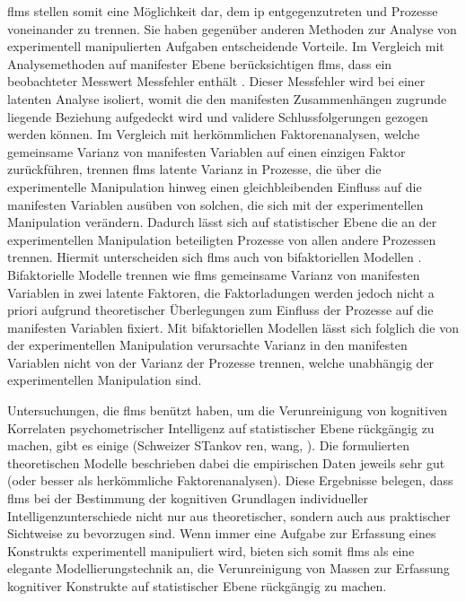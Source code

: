 \documentclass[11pt, twoside, a4paper]{book}		%
\begin{document}
\glspl{flm} stellen somit eine Möglichkeit dar, dem \gls{ip} entgegenzutreten und Prozesse voneinander zu trennen. Sie haben gegenüber anderen Methoden zur Analyse von experimentell manipulierten Aufgaben entscheidende Vorteile.
Im Vergleich mit Analysemethoden auf manifester Ebene berücksichtigen \glspl{flm}, dass ein beobachteter Messwert Messfehler enthält \citep{Moosbrugger2007}. Dieser Messfehler wird bei einer latenten Analyse isoliert, womit die den manifesten Zusammenhängen zugrunde liegende Beziehung aufgedeckt wird und validere Schlussfolgerungen gezogen werden können.
Im Vergleich mit herkömmlichen Faktorenanalysen, welche gemeinsame Varianz von manifesten Variablen auf einen einzigen Faktor zurückführen, trennen \glspl{flm} latente Varianz in Prozesse, die über die experimentelle Manipulation hinweg einen gleichbleibenden Einfluss auf die manifesten Variablen ausüben von solchen, die sich mit der experimentellen Manipulation verändern. Dadurch lässt sich auf statistischer Ebene die an der experimentellen Manipulation beteiligten Prozesse von allen andere Prozessen trennen.
Hiermit unterscheiden sich \glspl{flm} auch von bifaktoriellen Modellen \citep{Moosbrugger2006, Schweizer2010}. Bifaktorielle Modelle trennen wie \glspl{flm} gemeinsame Varianz von manifesten Variablen in zwei latente Faktoren, die Faktorladungen werden jedoch nicht a priori aufgrund theoretischer Überlegungen zum Einfluss der Prozesse auf die manifesten Variablen fixiert. Mit bifaktoriellen Modellen lässt sich folglich die von der experimentellen Manipulation verursachte Varianz in den manifesten Variablen nicht von der Varianz der Prozesse trennen, welche unabhängig der experimentellen Manipulation sind.

Untersuchungen, die \glspl{flm} benützt haben, um die Verunreinigung von kognitiven Korrelaten psychometrischer Intelligenz auf statistischer Ebene rückgängig zu machen, gibt es einige \citep[z. B.][]{} (Schweizer STankov ren, wang, ). Die formulierten theoretischen Modelle beschrieben dabei die empirischen Daten jeweils sehr gut (oder besser als herkömmliche Faktorenanalysen). Diese Ergebnisse belegen, dass \glspl{flm} bei der Bestimmung der kognitiven Grundlagen individueller Intelligenzunterschiede nicht nur aus theoretischer, sondern auch aus praktischer Sichtweise zu bevorzugen sind. Wenn immer eine Aufgabe zur Erfassung eines Konstrukts experimentell manipuliert wird, bieten sich somit \glspl{flm} als eine elegante Modellierungstechnik an, die Verunreinigung von Massen zur Erfassung kognitiver Konstrukte auf statistischer Ebene rückgängig zu machen.
\end{document}
